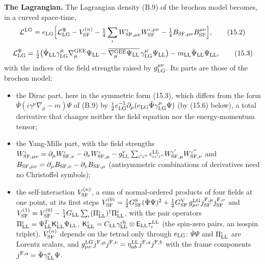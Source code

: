 \documentclass[
  10pt,
]{article}
\providecommand{\tightlist}{%
  \setlength{\itemsep}{0pt}\setlength{\parskip}{0pt}}
\begin{document}
\textbf{The Lagrangian.} The Lagrangian density (B.9) of the brochon
model becomes, in a curved space-time,
\[\mathcal L^{\rm LG}=e_{\rm LG}\Big[\mathcal L^{\Psi}_{\rm LG}-V^{(n)}_{\rm SF}-\tfrac14\sum_\iota W^\iota_{{\rm SF},\mu\nu}W^{\iota,\mu\nu}_{\rm SF}-\tfrac14B_{{\rm SF},\mu\nu}B^{\mu\nu}_{\rm SF}\Big],\tag{15.2}\]
\[\mathcal L^{\Psi}_{\rm LG}=\tfrac i2\big(\bar\Psi_{\rm LL}\gamma^\mu_{\rm LG}\nabla^{\rm GEE}_\mu\Psi_{\rm LL}-\overline{\nabla^{\rm GEE}_\mu\Psi_{\rm LL}}\,\gamma^\mu_{\rm LG}\Psi_{\rm LL}\big)-m_{\rm LL}\bar\Psi_{\rm LL}\Psi_{\rm LL},\tag{15.3}\]
with the indices of the field strengths raised by
\(g_{\rm LG}^{\mu\nu}\). Its parts are those of the brochon model:

\begin{itemize}
\tightlist
\item
  the Dirac part, here in the symmetric form (15.3), which differs from
  the form \(\bar\Psi(i\gamma^\mu\nabla_\mu-m)\Psi\) of (B.9) by
  \(\tfrac i2e_{\rm LG}^{-1}\partial_\mu(e_{\rm LG}\bar\Psi\gamma^\mu_{\rm LG}\Psi)\)
  (by (15.6) below), a total derivative that changes neither the field
  equation nor the energy-momentum tensor;
\item
  the Yang-Mills part, with the field strengths
  \(W^\iota_{{\rm SF},\mu\nu}=\partial_\mu W^\iota_{{\rm SF},\nu}-\partial_\nu W^\iota_{{\rm SF},\mu}-g^{\rm v}_{\rm LL}\sum_{\iota'\iota''}\epsilon^{\rm LL}_{\iota\iota'\iota''}W^{\iota'}_{{\rm SF},\mu}W^{\iota''}_{{\rm SF},\nu}\)
  and
  \(B_{{\rm SF},\mu\nu}=\partial_\mu B_{{\rm SF},\nu}-\partial_\nu B_{{\rm SF},\mu}\)
  (antisymmetric combinations of derivatives need no Christoffel
  symbols);
\item
  the self-interaction \(V^{(n)}_{\rm SF}\), a sum of normal-ordered
  products of four fields at one point, at its first steps
  \(V^{(0)}_{\rm SF}=\tfrac12G^{\rm S}_{\rm SF}(\bar\Psi\Psi)^2+\tfrac12G^{\rm V}_{\rm SF}\,g^{\rm LG}_{\mu\nu}j^{{\rm F},\mu}_{\rm SF}j^{{\rm F},\nu}_{\rm SF}\)
  and
  \(V^{(1)}_{\rm SF}=V^{(0)}_{\rm SF}-\tfrac14G_{\rm LL}\sum_\iota(\Pi^\iota_{\rm LL})^\dagger\Pi^\iota_{\rm LL}\),
  with the pair operators
  \(\Pi^\iota_{\rm LL}=\Psi^T_{\rm LL}\mathsf K^\iota_{\rm LL}\Psi_{\rm LL}\),
  \(\mathsf K^\iota_{\rm LL}=C_{\rm LL}\gamma^{\rm ch}_{\rm LL}\otimes\mathsf E_{\rm LL}\tau^{\rm LL}_\iota\)
  (the spin-zero pairs, an isospin triplet). \(V^{(n)}_{\rm SF}\)
  depends on the tetrad only through \(e_{\rm LG}\): \(\bar\Psi\Psi\)
  and \(\Pi^\iota_{\rm LL}\) are Lorentz scalars, and
  \(g^{\rm LG}_{\mu\nu}j^{{\rm F},\mu}j^{{\rm F},\nu}=\eta^{\rm LL}_{ab}j^{{\rm F},a}j^{{\rm F},b}\)
  with the frame components
  \(j^{{\rm F},a}=\bar\Psi\gamma^a_{\rm LL}\Psi\).
\end{itemize}
\end{document}
